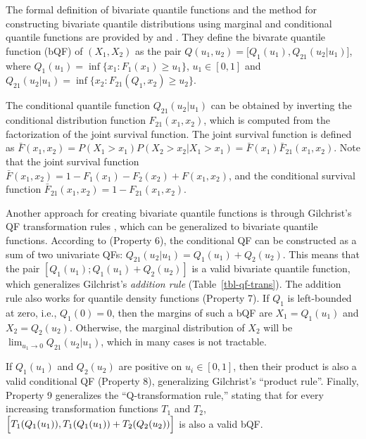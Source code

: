 \documentclass[
  fleqn,
  deca,
  blindrev
]{informs4}
\begin{document}
The formal definition of bivariate quantile functions and the method for
constructing bivariate quantile distributions using marginal and
conditional quantile functions are provided by
\citet{nair2023PropertiesBivariateDistributions} and
\citet{vineshkumar2019BivariateQuantileFunctions}. They define the
bivarate quantile function (bQF) of \((X_1, X_2)\) as the pair
\(Q(u_1, u_2)=\bigl[Q_1(u_1), Q_{21}(u_2\vert u_1)\bigr]\), where
\(Q_1(u_1)=\inf \{x_1: F_1(x_1)\geq u_1\}\), \(u_1\in[0,1]\) and
\(Q_{21}(u_2\vert u_1)=\inf\{x_2: F_{21}(Q_1, x_2)\geq u_2\}\).

The conditional quantile function \(Q_{21}(u_2\vert u_1)\) can be
obtained by inverting the conditional distribution function
\(F_{21}(x_1, x_2)\), which is computed from the factorization of the
joint survival function. The joint survival function is defined as
\(\bar{F}(x_1, x_2)=P(X_1> x_1)P(X_2> x_2 \vert X_1 > x_1)= \bar{F}(x_1)\bar{F}_{21}(x_1,x_2)\).
Note that the joint survival function
\(\bar{F}(x_1,x_2)=1-F_1(x_1)-F_2(x_2)+F(x_1,x_2)\), and the conditional
survival function \(\bar{F}_{21}(x_1,x_2)=1-F_{21}(x_1,x_2)\).

Another approach for creating bivariate quantile functions is through
Gilchrist's QF transformation rules
\citep{gilchrist2000StatisticalModellingQuantile}, which can be
generalized to bivariate quantile functions. According to
\citet{nair2023PropertiesBivariateDistributions} (Property 6), the
conditional QF can be constructed as a sum of two univariate QFs:
\(Q_{21}(u_2\vert u_1) = Q_1(u_1) + Q_2(u_2)\). This means that the pair
\([Q_1(u_1) ; Q_1(u_1) + Q_2(u_2)]\) is a valid bivariate quantile
function, which generalizes Gilchrist's \emph{addition rule}
(Table~\ref{tbl-qf-trans}). The addition rule also works for quantile
density functions (Property 7). If \(Q_1\) is left-bounded at zero,
i.e., \(Q_1(0) = 0\), then the margins of such a bQF are
\(X_1 = Q_1(u_1)\) and \(X_2 = Q_2(u_2)\). Otherwise, the marginal
distribution of \(X_2\) will be
\(\lim_{u_1 \rightarrow 0}Q_{21}(u_2\vert u_1)\), which in many cases is
not tractable.

If \(Q_1(u_1)\) and \(Q_2(u_2)\) are positive on \(u_i \in [0,1]\), then
their product is also a valid conditional QF (Property 8), generalizing
Gilchrist's ``product rule''. Finally, Property 9 generalizes the
``Q-transformation rule,'' stating that for every increasing
transformation functions \(T_1\) and \(T_2\),
\(\Bigl[T_1(Q_1(u_1)), T_1(Q_1(u_1)) + T_2(Q_2(u_2))\Bigr]\) is also a
valid bQF.
\end{document}
